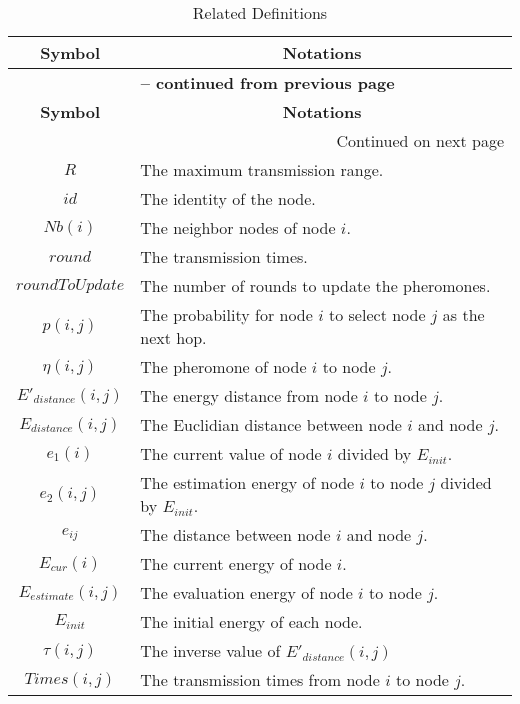 \documentclass{elsarticle}
\begin{document}
\begin{center}
\begin{longtable}{|c|p{6cm}|}
\caption{Related Definitions} \label{tab:definitions} \\\hline
\multicolumn{1}{|c|}{\textbf{Symbol}} & \multicolumn{1}{c|}{\textbf{Notations}} \\
\hline \endfirsthead \multicolumn{2}{c}{{\bfseries \tablename\ \thetable{} -- continued from previous page}} \\
\hline \multicolumn{1}{|c|}{\textbf{Symbol}} &\multicolumn{1}{c|}{\textbf{Notations}} \\
\hline \endhead \hline \multicolumn{2}{|r|}{{Continued on next page}} \\
\hline\endfoot \hline \hline\endlastfoot
$R$ & The maximum transmission range. \\
$id$ & The identity of the node. \\
$Nb(i)$ & The neighbor nodes of node $i$. \\
$round$ & The transmission times. \\
$roundToUpdate$ & The number of rounds to update the pheromones. \\
$p(i,j)$ & The probability for node $i$ to select node $j$ as the next hop.\\
$\eta(i,j)$ & The pheromone of node $i$ to node $j$.\\
$E'_{distance}(i,j)$ & The energy distance from node $i$ to node $j$.\\
$E_{distance}(i,j)$ & The Euclidian distance between node $i$ and node $j$. \\
$e_1(i)$ & The current value of node $i$ divided by $E_{init}$. \\
$e_2(i,j)$ & The estimation energy of node $i$ to node $j$ divided by  $E_{init}$. \\
$e_{ij}$ & The distance between node $i$ and node $j$. \\
$E_{cur}(i)$ & The current energy of node $i$.\\
$E_{estimate}(i,j)$ & The evaluation energy of node $i$ to node $j$.\\
$E_{init}$ & The initial energy of each node. \\
$\tau(i,j)$ & The inverse value of $E'_{distance}(i,j)$ \\
$Times(i,j)$ & The transmission times from node $i$ to node $j$. \\


\end{longtable}
\end{center}
\end{document}
